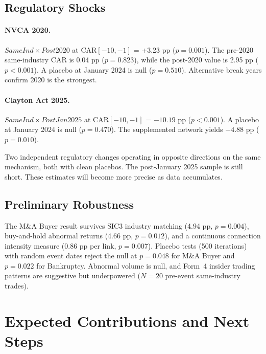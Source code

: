 \documentclass[12pt]{article}
\begin{document}


\subsection{Regulatory Shocks}



\paragraph{NVCA 2020.} $SameInd \times Post2020$ at CAR$[-10,-1]$ = +3.23 pp ($p=0.001$). The pre-2020 same-industry CAR is 0.04 pp ($p=0.823$), while the post-2020 value is 2.95 pp ($p<0.001$). A placebo at January 2024 is null ($p=0.510$). Alternative break years confirm 2020 is the strongest.

\paragraph{Clayton Act 2025.} $SameInd \times PostJan2025$ at CAR$[-10,-1]$ = $-10.19$ pp ($p<0.001$). A placebo at January 2024 is null ($p=0.470$). The supplemented network yields $-4.88$ pp ($p=0.010$).

Two independent regulatory changes operating in opposite directions on the same mechanism, both with clean placebos. The post-January 2025 sample is still short. These estimates will become more precise as data accumulates.

\subsection{Preliminary Robustness}

The M\&A Buyer result survives SIC3 industry matching (4.94 pp, $p=0.004$), buy-and-hold abnormal returns (4.66 pp, $p=0.012$), and a continuous connection intensity measure (0.86 pp per link, $p=0.007$). Placebo tests (500 iterations) with random event dates reject the null at $p=0.048$ for M\&A Buyer and $p=0.022$ for Bankruptcy. Abnormal volume is null, and Form~4 insider trading patterns are suggestive but underpowered ($N=20$ pre-event same-industry trades).

\section{Expected Contributions and Next Steps}
\label{sec:conclusion}
\end{document}
